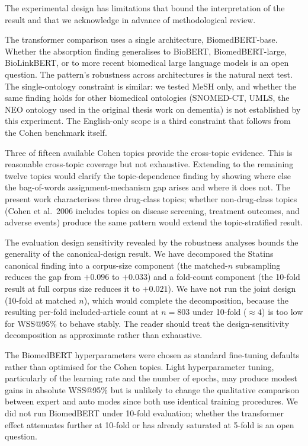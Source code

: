 \documentclass[11pt,a4paper]{article}
\begin{document}
The experimental design has limitations that bound the interpretation of the result and that we acknowledge in advance of methodological review.

The transformer comparison uses a single architecture, BiomedBERT-base. Whether the absorption finding generalises to BioBERT, BiomedBERT-large, BioLinkBERT, or to more recent biomedical large language models is an open question. The pattern's robustness across architectures is the natural next test. The single-ontology constraint is similar: we tested MeSH only, and whether the same finding holds for other biomedical ontologies (SNOMED-CT, UMLS, the NEO ontology used in the original thesis work on dementia) is not established by this experiment. The English-only scope is a third constraint that follows from the Cohen benchmark itself.

Three of fifteen available Cohen topics provide the cross-topic evidence. This is reasonable cross-topic coverage but not exhaustive. Extending to the remaining twelve topics would clarify the topic-dependence finding by showing where else the bag-of-words assignment-mechanism gap arises and where it does not. The present work characterises three drug-class topics; whether non-drug-class topics (Cohen et al.\ 2006 includes topics on disease screening, treatment outcomes, and adverse events) produce the same pattern would extend the topic-stratified result.

The evaluation design sensitivity revealed by the robustness analyses bounds the generality of the canonical-design result. We have decomposed the Statins canonical finding into a corpus-size component (the matched-$n$ subsampling reduces the gap from $+0.096$ to $+0.033$) and a fold-count component (the 10-fold result at full corpus size reduces it to $+0.021$). We have not run the joint design (10-fold at matched $n$), which would complete the decomposition, because the resulting per-fold included-article count at $n = 803$ under 10-fold ($\approx 4$) is too low for WSS@95\% to behave stably. The reader should treat the design-sensitivity decomposition as approximate rather than exhaustive.

The BiomedBERT hyperparameters were chosen as standard fine-tuning defaults rather than optimised for the Cohen topics. Light hyperparameter tuning, particularly of the learning rate and the number of epochs, may produce modest gains in absolute WSS@95\% but is unlikely to change the qualitative comparison between expert and auto modes since both use identical training procedures. We did not run BiomedBERT under 10-fold evaluation; whether the transformer effect attenuates further at 10-fold or has already saturated at 5-fold is an open question.
\end{document}
